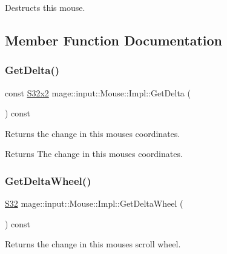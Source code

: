 Destructs this mouse. 

\subsection{Member Function Documentation}
\hypertarget{classmage_1_1input_1_1_mouse_1_1_impl_aa255160dc9930673d94672ae1e9f43e8}{}\label{classmage_1_1input_1_1_mouse_1_1_impl_aa255160dc9930673d94672ae1e9f43e8} 
\subsubsection{\texorpdfstring{Get\+Delta()}{GetDelta()}}
{\footnotesize\ttfamily const \hyperlink{namespacemage_a02de5a44f35ee9917e5788d63795fece}{S32x2} mage\+::input\+::\+Mouse\+::\+Impl\+::\+Get\+Delta (\begin{DoxyParamCaption}{ }\end{DoxyParamCaption}) const\hspace{0.3cm}{\ttfamily [noexcept]}}

Returns the change in this mouse\textquotesingle{}s coordinates.

\begin{DoxyReturn}{Returns}
The change in this mouse\textquotesingle{}s coordinates. 
\end{DoxyReturn}
\hypertarget{classmage_1_1input_1_1_mouse_1_1_impl_ad2cd4f1d06038ab71e9db2802598bd16}{}\label{classmage_1_1input_1_1_mouse_1_1_impl_ad2cd4f1d06038ab71e9db2802598bd16} 
\subsubsection{\texorpdfstring{Get\+Delta\+Wheel()}{GetDeltaWheel()}}
{\footnotesize\ttfamily \hyperlink{namespacemage_a642e05c5c83642b6946703615cdbf2da}{S32} mage\+::input\+::\+Mouse\+::\+Impl\+::\+Get\+Delta\+Wheel (\begin{DoxyParamCaption}{ }\end{DoxyParamCaption}) const\hspace{0.3cm}{\ttfamily [noexcept]}}

Returns the change in this mouse\textquotesingle{}s scroll wheel.


